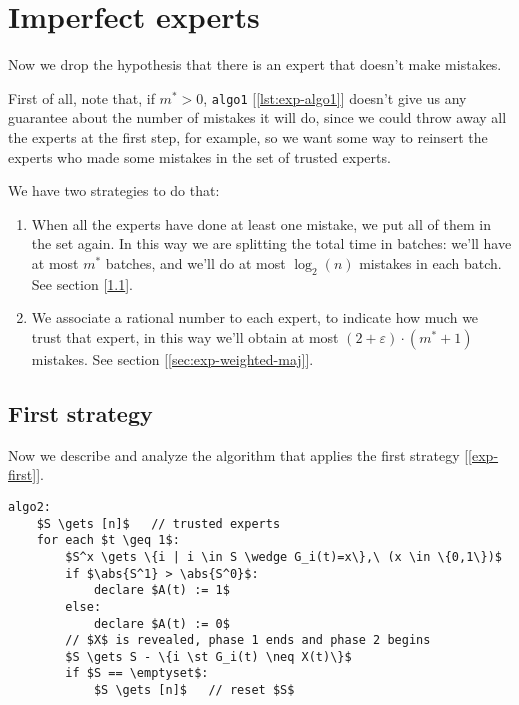 \section{Imperfect experts}\label{sec:imperfect-experts}

Now we drop the hypothesis that there is an expert that doesn't make mistakes.

First of all, note that, if $m^* > 0$, \texttt{algo1} [\ref{lst:exp-algo1}] doesn't give us any guarantee about the number of mistakes it will do, since we could throw away all the experts at the first step, for example, so we want some way to reinsert the experts who made some mistakes in the set of trusted experts.

We have two strategies to do that:
\begin{enumerate}
    \item When all the experts have done at least one mistake, we put all of them in the set again. In this way we are splitting the total time in batches: we'll have at most $m^*$ batches, and we'll do at most $\log_2(n)$ mistakes in each batch. See section [\ref{sec:exp-first}].\label{exp-first}
    \item We associate a rational number to each expert, to indicate how much we trust that expert, in this way we'll obtain at most $(2 + \varepsilon)\cdot(m^* + 1)$ mistakes. See section [\ref{sec:exp-weighted-maj}].\label{exp-second}
\end{enumerate}


\subsection{First strategy}\label{sec:exp-first}
Now we describe and analyze the algorithm that applies the first strategy [\ref{exp-first}].
\begin{lstlisting}[caption={Algo 2}, label={lst:exp-algo2}]
algo2:
    $S \gets [n]$   // trusted experts
    for each $t \geq 1$:
        $S^x \gets \{i | i \in S \wedge G_i(t)=x\},\ (x \in \{0,1\})$
        if $\abs{S^1} > \abs{S^0}$:
            declare $A(t) := 1$
        else:
            declare $A(t) := 0$
        // $X$ is revealed, phase 1 ends and phase 2 begins
        $S \gets S - \{i \st G_i(t) \neq X(t)\}$
        if $S == \emptyset$:
            $S \gets [n]$   // reset $S$
\end{lstlisting}

